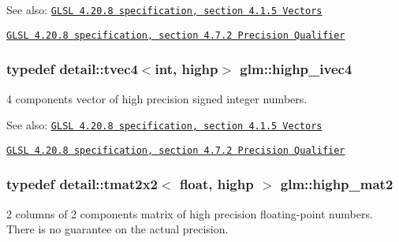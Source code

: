 \begin{Desc}
\item[See also:]\href{http://www.opengl.org/registry/doc/GLSLangSpec.4.20.8.pdf}{\tt GLSL 4.20.8 specification, section 4.1.5 Vectors} 

\href{http://www.opengl.org/registry/doc/GLSLangSpec.4.20.8.pdf}{\tt GLSL 4.20.8 specification, section 4.7.2 Precision Qualifier} \end{Desc}
\hypertarget{group__core__precision_geba08fcf78aeae954c3335d73500ff8b}{
\subsubsection[highp\_\-ivec4]{\setlength{\rightskip}{0pt plus 5cm}typedef detail::tvec4$<$int, highp$>$ {\bf glm::highp\_\-ivec4}}}
\label{group__core__precision_geba08fcf78aeae954c3335d73500ff8b}


4 components vector of high precision signed integer numbers.

\begin{Desc}
\item[See also:]\href{http://www.opengl.org/registry/doc/GLSLangSpec.4.20.8.pdf}{\tt GLSL 4.20.8 specification, section 4.1.5 Vectors} 

\href{http://www.opengl.org/registry/doc/GLSLangSpec.4.20.8.pdf}{\tt GLSL 4.20.8 specification, section 4.7.2 Precision Qualifier} \end{Desc}
\hypertarget{group__core__precision_gb9884251d84b95dbbf27aa1e4b3a1ec7}{
\subsubsection[highp\_\-mat2]{\setlength{\rightskip}{0pt plus 5cm}typedef detail::tmat2x2$<$ float, highp $>$ {\bf glm::highp\_\-mat2}}}
\label{group__core__precision_gb9884251d84b95dbbf27aa1e4b3a1ec7}


2 columns of 2 components matrix of high precision floating-point numbers. There is no guarantee on the actual precision.

